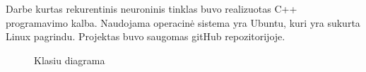 Darbe kurtas rekurentinis neuroninis tinklas buvo realizuotas C++ programavimo kalba. Naudojama operacinė sistema yra Ubuntu, kuri yra sukurta Linux pagrindu. Projektas buvo saugomas gitHub repozitorijoje.
\clearpage

\begin{figure}[h!]
  \centering
{}
\caption{Klasiu diagrama}
\label{fig:classdiag}
\end{figure}
